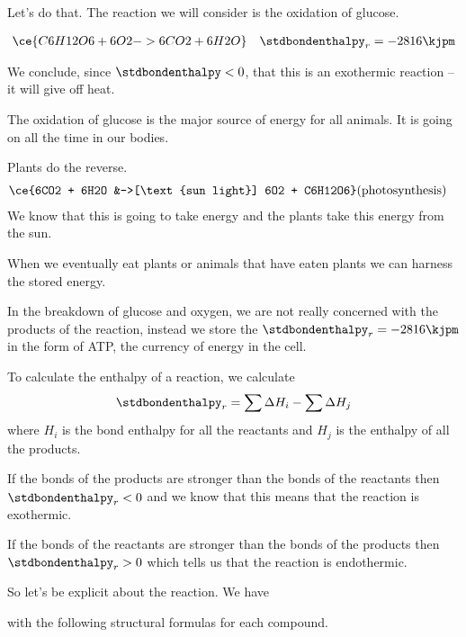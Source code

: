\documentclass[../mit-general-chemistry.tex]{subfiles}
\begin{document}
Let's do that. The reaction we will consider is the oxidation of glucose.

\begin{align*}
  &\ce{C6H12O6 + 6O2 -> 6CO2 + 6H2O} &\stdbondenthalpy_r = -2816 \kjpm
\end{align*}

We conclude, since $\stdbondenthalpy < 0$, that this is an exothermic
reaction -- it will give off heat.


The oxidation of glucose is the major source of energy for all
animals. It is going on all the time in our bodies.

Plants do the reverse.
\begin{align*}
  \ce{6CO2 + 6H2O &->[\text{sun light}] 6O2 + C6H12O6} &\text{(photosynthesis)}
\end{align*}
We know that this is going to take energy and the plants take this
energy from the sun.

When we eventually eat plants or animals that have eaten plants we
can harness the stored energy.



In the breakdown of glucose and oxygen, we are not really concerned
with the products of the reaction, instead we store the
$\stdbondenthalpy_r = -2816 \kjpm$ in the form of ATP, the currency of
energy in the cell.

To calculate the enthalpy of a reaction, we calculate
\begin{equation*}
  \stdbondenthalpy_r = \sum \Delta H_i - \sum \Delta H_j
\end{equation*}
where $H_i$ is the bond enthalpy for all the reactants and $H_j$ is
the enthalpy of all the products.

If the bonds of the products are stronger than the bonds of the
reactants then $\stdbondenthalpy_r < 0$ and we know that this means
that the reaction is exothermic.

If the bonds of the reactants are stronger than the bonds of the
products then $\stdbondenthalpy_r > 0$ which tells us that the
reaction is endothermic.

So let's be explicit about the reaction. We have

with the following structural formulas for each compound.

\begin{center}
\end{center}
\end{document}

